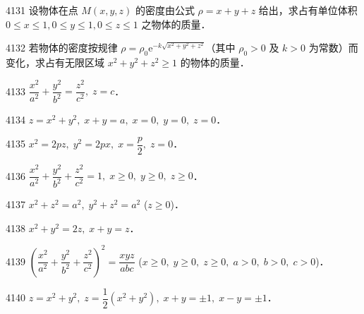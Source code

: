 
\begin{prob}[M]{4131}
设物体在点 $M(x,y,z)$ 的密度由公式 $\rho = x + y + z$ 给出，求占有单位体积 $0 \leqslant x \leqslant 1, 0 \leqslant y \leqslant 1, 0 \leqslant z \leqslant 1$ 之物体的质量．
\end{prob}

\begin{prob}[M]{4132}
若物体的密度按规律 $\rho = \rho_0 \mathrm{e}^{-k\sqrt{x^2+y^2+z^2}}$（其中 $\rho_0 > 0$ 及 $k > 0$ 为常数）而变化，求占有无限区域 $x^2 + y^2 + z^2 \geqslant 1$ 的物体的质量．
\end{prob}


\begin{prob}[S]{4133}
$\dfrac{x^2}{a^2} + \dfrac{y^2}{b^2} = \dfrac{z^2}{c^2},\; z = c$．
\end{prob}

\begin{prob}[S]{4134}
$z = x^2 + y^2,\; x + y = a,\; x = 0,\; y = 0,\; z = 0$．
\end{prob}

\begin{prob}[S]{4135}
$x^2 = 2pz,\; y^2 = 2px,\; x = \dfrac{p}{2},\; z = 0$．
\end{prob}

\begin{prob}[S]{4136}
$\dfrac{x^2}{a^2} + \dfrac{y^2}{b^2} + \dfrac{z^2}{c^2} = 1,\; x \geqslant 0,\; y \geqslant 0,\; z \geqslant 0$．
\end{prob}

\begin{prob}[S]{4137}
$x^2 + z^2 = a^2,\; y^2 + z^2 = a^2$ ($z \geqslant 0$)．
\end{prob}

\begin{prob}[S]{4138}
$x^2 + y^2 = 2z,\; x + y = z$．
\end{prob}

\begin{prob}[S]{4139}
$\left(\dfrac{x^2}{a^2} + \dfrac{y^2}{b^2} + \dfrac{z^2}{c^2}\right)^2 = \dfrac{xyz}{abc}$ ($x \geqslant 0,\; y \geqslant 0,\; z \geqslant 0,\; a > 0,\; b > 0,\; c > 0$)．
\end{prob}

\begin{prob}[S]{4140}
$z = x^2 + y^2,\; z = \dfrac{1}{2}(x^2 + y^2),\; x + y = \pm 1,\; x - y = \pm 1$．
\end{prob}

